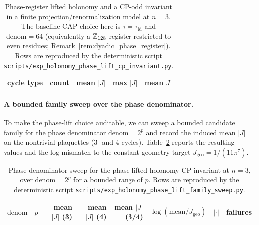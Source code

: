 \begin{table}[t]
\centering
\small
\setlength{\tabcolsep}{10pt}
\renewcommand{\arraystretch}{1.15}
\begin{tabular}{lrrrr}
\toprule
cycle type & count & mean $|J|$ & max $|J|$ & mean $J$ \\
\midrule
%
\end{tabular}
\caption{Phase-register lifted holonomy and a CP-odd invariant in a finite projection/renormalization model at $n=3$. The baseline CAP choice here is $\tau=\tau_{\mathrm{id}}$ and $\mathrm{denom}=64$ (equivalently a $\mathbb{Z}_{128}$ register restricted to even residues; Remark~\ref{rem:dyadic_phase_register}). Rows are reproduced by the deterministic script \texttt{scripts/exp\_holonomy\_phase\_lift\_cp\_invariant.py}.}
\label{tab:holonomy_phase_lift_j}
\end{table}

\paragraph{A bounded family sweep over the phase denominator.}
To make the phase-lift choice auditable, we can sweep a bounded candidate family for the phase denominator $\mathrm{denom}=2^p$ and record the induced mean $|J|$ on the nontrivial plaquettes (3- and 4-cycles).
Table~\ref{tab:holonomy_phase_lift_family} reports the resulting values and the log mismatch to the constant-geometry target $J_{\mathrm{geo}}=1/(11\pi^7)$.

\begin{table}[t]
\centering
\scriptsize
\setlength{\tabcolsep}{6pt}
\renewcommand{\arraystretch}{1.15}
\begin{tabular}{rrrrrrrr}
\toprule
$\mathrm{denom}$ & $p$ & mean $|J|$ (3) & mean $|J|$ (4) & mean $|J|$ (3/4) & $\log(\mathrm{mean}/J_{\mathrm{geo}})$ & $|\cdot|$ & failures \\
\midrule
%
\end{tabular}
\caption{Phase-denominator sweep for the phase-lifted holonomy CP invariant at $n=3$, over $\mathrm{denom}=2^p$ for a bounded range of $p$. Rows are reproduced by the deterministic script \texttt{scripts/exp\_holonomy\_phase\_lift\_family\_sweep.py}.}
\label{tab:holonomy_phase_lift_family}
\end{table}

